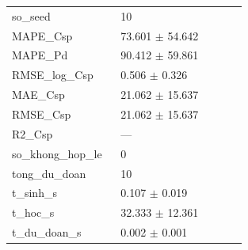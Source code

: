\begin{longtable}{p{0.43\linewidth}p{0.50\linewidth}}
so\_\allowbreak seed & 10 \\
MAPE\_\allowbreak Csp & 73.601 $\pm$ 54.642 \\
MAPE\_\allowbreak Pd & 90.412 $\pm$ 59.861 \\
RMSE\_\allowbreak log\_\allowbreak Csp & 0.506 $\pm$ 0.326 \\
MAE\_\allowbreak Csp & 21.062 $\pm$ 15.637 \\
RMSE\_\allowbreak Csp & 21.062 $\pm$ 15.637 \\
R2\_\allowbreak Csp & — \\
so\_\allowbreak khong\_\allowbreak hop\_\allowbreak le & 0 \\
tong\_\allowbreak du\_\allowbreak doan & 10 \\
t\_\allowbreak sinh\_\allowbreak s & 0.107 $\pm$ 0.019 \\
t\_\allowbreak hoc\_\allowbreak s & 32.333 $\pm$ 12.361 \\
t\_\allowbreak du\_\allowbreak doan\_\allowbreak s & 0.002 $\pm$ 0.001 \\
\midrule
\bottomrule
\end{longtable}
